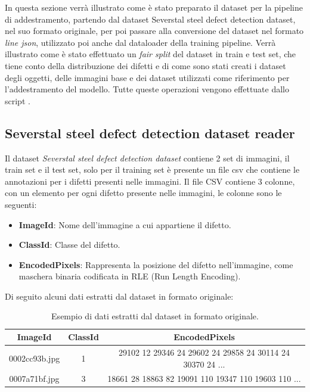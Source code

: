 In questa sezione verrà illustrato come è stato preparato il dataset per la pipeline di addestramento, partendo dal dataset
Severstal steel defect detection dataset, nel suo formato originale, per poi passare alla conversione del dataset nel formato \textit{line json},
utilizzato poi anche dal dataloader della training pipeline.
Verrà illustrato come è stato effettuato un \textit{fair split} del dataset in train e test set, che tiene conto della distribuzione dei difetti
e di come sono stati creati i dataset degli oggetti, delle immagini base e dei dataset utilizzati come riferimento per l'addestramento del modello.
Tutte queste operazioni vengono effettuate dallo script .

\subsection{Severstal steel defect detection dataset reader}
Il dataset \textit{Severstal steel defect detection dataset} contiene 2 set di immagini, il train set e il test set, solo per il
training set è presente un file csv che contiene le annotazioni per i difetti presenti nelle immagini.
Il file CSV contiene 3 colonne, con un elemento per ogni difetto presente nelle immagini, le colonne sono le seguenti:

\begin{itemize}
    \item \textbf{ImageId}: Nome dell'immagine a cui appartiene il difetto.
    \item \textbf{ClassId}: Classe del difetto.
    \item \textbf{EncodedPixels}: Rappresenta la posizione del difetto nell'immagine, come maschera binaria codificata in RLE (Run Length Encoding).
\end{itemize}

Di seguito alcuni dati estratti dal dataset in formato originale:

\begin{table}[H]
    \centering
    \begin{tabular}{|c|c|c|}
        \hline
        ImageId & ClassId & EncodedPixels \\
        \hline
        0002cc93b.jpg & 1 & 29102 12 29346 24 29602 24 29858 24 30114 24 30370 24 ... \\
        \hline
        0007a71bf.jpg & 3 & 18661 28 18863 82 19091 110 19347 110 19603 110 ... \\
        \hline
    \end{tabular}
    \caption{Esempio di dati estratti dal dataset in formato originale.}
    \label{tab:Severstal steel defect detection dataset}
\end{table}

